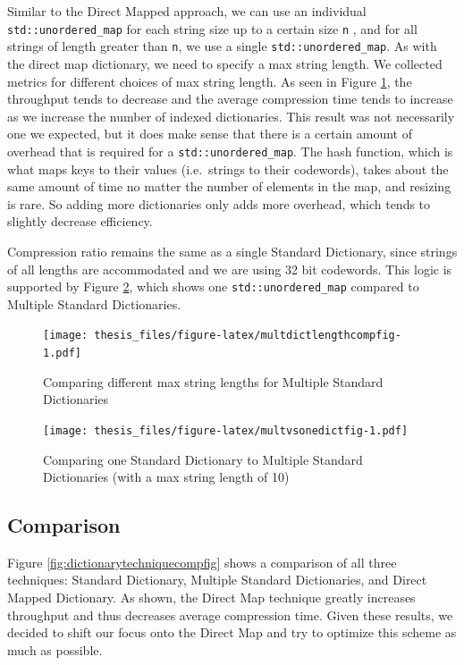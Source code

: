 \documentclass[12pt,twoside]{reedthesis}
\begin{document}
Similar to the Direct Mapped approach, we can use an individual \texttt{std::unordered\_map} for each string size up to a certain size \texttt{n} , and for all strings of length greater than \texttt{n}, we use a single \texttt{std::unordered\_map}. As with the direct map dictionary, we need to specify a max string length. We collected metrics for different choices of max string length. As seen in Figure \ref{fig:multdictlengthcompfig}, the throughput tends to decrease and the average compression time tends to increase as we increase the number of indexed dictionaries. This result was not necessarily one we expected, but it does make sense that there is a certain amount of overhead that is required for a \texttt{std::unordered\_map}. The hash function, which is what maps keys to their values (i.e.~strings to their codewords), takes about the same amount of time no matter the number of elements in the map, and resizing is rare. So adding more dictionaries only adds more overhead, which tends to slightly decrease efficiency.

Compression ratio remains the same as a single Standard Dictionary, since strings of all lengths are accommodated and we are using 32 bit codewords.
This logic is supported by Figure \ref{fig:multvsonedictfig}, which shows one \texttt{std::unordered\_map} compared to Multiple Standard Dictionaries.
\begin{figure}
\centering
\texttt{[image: thesis\_files/figure-latex/multdictlengthcompfig-1.pdf]}
\caption{\label{fig:multdictlengthcompfig}Comparing different max string lengths for Multiple Standard Dictionaries}
\end{figure}
\begin{figure}
\centering
\texttt{[image: thesis\_files/figure-latex/multvsonedictfig-1.pdf]}
\caption{\label{fig:multvsonedictfig}Comparing one Standard Dictionary to Multiple Standard Dictionaries (with a max string length of 10)}
\end{figure}
\hypertarget{comparison-1}{%
\subsection{Comparison}\label{comparison-1}}

Figure \ref{fig:dictionarytechniquecompfig} shows a comparison of all three techniques: Standard Dictionary, Multiple Standard Dictionaries, and Direct Mapped Dictionary. As shown, the Direct Map technique greatly increases throughput and thus decreases average compression time. Given these results, we decided to shift our focus onto the Direct Map and try to optimize this scheme as much as possible.
\end{document}
